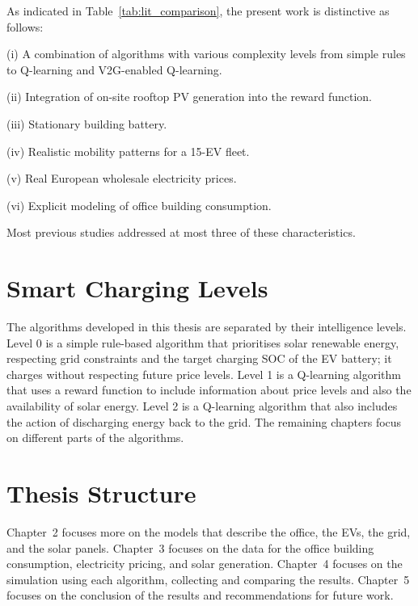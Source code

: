 As indicated in Table~\ref{tab:lit_comparison}, the present work is distinctive as follows:

(i) A combination of algorithms with various complexity levels from simple rules to Q-learning and V2G-enabled Q-learning.

(ii) Integration of on-site rooftop PV generation into the reward function.

(iii) Stationary building battery.

(iv) Realistic mobility patterns for a 15-EV fleet.

(v) Real European wholesale electricity prices.

(vi) Explicit modeling of office building consumption.

Most previous studies addressed at most three of these characteristics.

\section{Smart Charging Levels}
\label{sec:smart_charging_levels}

The algorithms developed in this thesis are separated by their intelligence levels. Level 0 is a simple rule-based algorithm that prioritises solar renewable energy, respecting grid constraints and the target charging SOC of the EV battery; it charges without respecting future price levels. 
Level 1 is a Q-learning algorithm that uses a reward function to include information about price levels and also the availability of solar energy. Level 2 is a Q-learning algorithm that also includes the action of discharging energy back to the grid. The remaining chapters focus on different parts of the algorithms.

\section{Thesis Structure}
\label{sec:structure}

Chapter~2 focuses more on the models that describe the office, the EVs, the grid, and the solar panels. Chapter~3 focuses on the data for the office building consumption, electricity pricing, and solar generation. Chapter~4 focuses on the simulation using each algorithm, collecting and comparing the results.
Chapter~5 focuses on the conclusion of the results and recommendations for future work.